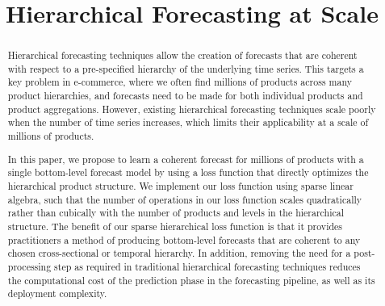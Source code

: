 \documentclass[preprint, 3p, times, twocolumn]{elsarticle}
\begin{document}
\begin{frontmatter}

\title{Hierarchical Forecasting at Scale}

\author{
}



\begin{abstract}
  Hierarchical forecasting techniques allow the creation of forecasts that are coherent with respect to a pre-specified hierarchy of the underlying time series. This targets a key problem in e-commerce, where we often find millions of products across many product hierarchies, and forecasts need to be made for both individual products and product aggregations. However, existing hierarchical forecasting techniques scale poorly when the number of time series increases, which limits their applicability at a scale of millions of products. 
  
  In this paper, we propose to learn a coherent forecast for millions of products with a single bottom-level forecast model by using a loss function that directly optimizes the hierarchical product structure. We implement our loss function using sparse linear algebra, such that the number of operations in our loss function scales quadratically rather than cubically with the number of products and levels in the hierarchical structure. The benefit of our sparse hierarchical loss function is that it provides practitioners a method of producing bottom-level forecasts that are coherent to any chosen cross-sectional or temporal hierarchy. In addition, removing the need for a post-processing step as required in traditional hierarchical forecasting techniques reduces the computational cost of the prediction phase in the forecasting pipeline, as well as its deployment complexity.  
  

\end{abstract}
\end{frontmatter}
\end{document}
